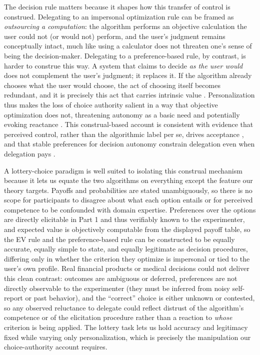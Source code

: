 \documentclass[a4paper, 12pt, fleqn]{article}
\theoremstyle{definition}
\newcommand{\inew}[1]{{\color{blue} #1\color{black}}}
\begin{document}
The decision rule matters because it shapes how this transfer of control is construed. Delegating to an impersonal optimization rule can be framed as \emph{outsourcing a computation}: the algorithm performs an objective calculation the user could not (or would not) perform, and the user's judgment remains conceptually intact, much like using a calculator does not threaten one's sense of being the decision-maker. Delegating to a preference-based rule, by contrast, is harder to construe this way. A system that claims to decide \emph{as the user would} does not complement the user's judgment; it replaces it. If the algorithm already chooses what the user would choose, the act of choosing itself becomes redundant, and it is precisely this act that carries intrinsic value \citep{Bartling2014,Owens2014}. Personalization thus makes the loss of choice authority salient in a way that objective optimization does not, threatening autonomy as a basic need \citep{DeciRyan2000} and potentially evoking reactance \citep{Brehm1966}. This construal-based account is consistent with evidence that perceived control, rather than the algorithmic label per se, drives acceptance \citep{Schaap2024}, and that stable preferences for decision autonomy constrain delegation even when delegation pays \citep{Ivanova-Stenzel2025}.

\inew{A lottery-choice paradigm is well suited to isolating this construal mechanism because it lets us equate the two algorithms on everything except the feature our theory targets. Payoffs and probabilities are stated unambiguously, so there is no scope for participants to disagree about what each option entails or for perceived competence to be confounded with domain expertise. Preferences over the options are directly elicitable in Part 1 and thus verifiably known to the experimenter, and expected value is objectively computable from the displayed payoff table, so the EV rule and the preference-based rule can be constructed to be equally accurate, equally simple to state, and equally legitimate as decision procedures, differing only in whether the criterion they optimize is impersonal or tied to the user's own profile. Real financial products or medical decisions could not deliver this clean contrast: outcomes are ambiguous or deferred, preferences are not directly observable to the experimenter (they must be inferred from noisy self-report or past behavior), and the ``correct'' choice is either unknown or contested, so any observed reluctance to delegate could reflect distrust of the algorithm's competence or of the elicitation procedure rather than a reaction to \emph{whose} criterion is being applied. The lottery task lets us hold accuracy and legitimacy fixed while varying only personalization, which is precisely the manipulation our choice-authority account requires.}
\end{document}
